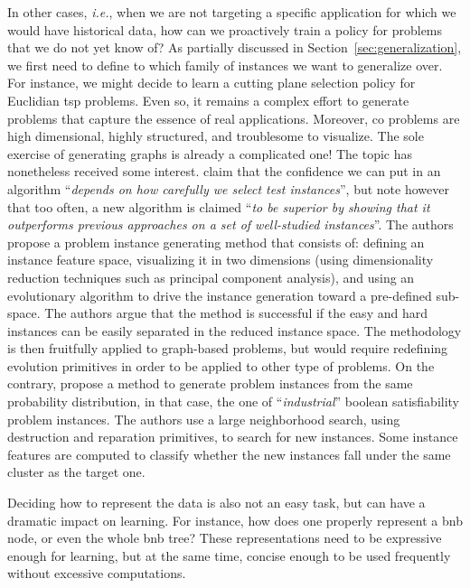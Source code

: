 \documentclass[11pt]{article}
\begin{document}
		In other cases, \textit{i.e.}, when we are not targeting a specific application for which we would
		have historical data, how can we proactively train a policy for problems that we do not yet know
		of?
		As partially discussed in Section~\ref{sec:generalization}, we first need to define to which family
		of instances we want to generalize over.
		For instance, we might decide to learn a cutting plane selection policy for Euclidian \gls{tsp}
		problems.
		Even so, it remains a complex effort to generate problems that capture the essence of real
		applications.
		Moreover, \gls{co} problems are high dimensional, highly structured, and troublesome to visualize.
		The sole exercise of generating graphs is already a complicated one!
		The topic has nonetheless received some interest.
		\cite{SmithGenerating2015} claim that the confidence we can put in an algorithm
		``\textit{depends on how carefully we select test instances}'', but note however that too often, a
		new algorithm is claimed ``\textit{to be superior by showing that it outperforms previous approaches
		on a set of well-studied instances}''.
		The authors propose a problem instance generating method that consists of: defining an instance
		feature space, visualizing it in two dimensions (using dimensionality reduction techniques such as
		principal component analysis), and using an evolutionary algorithm to drive the instance generation
		toward a pre-defined sub-space.
		The authors argue that the method is successful if the easy and hard instances can be easily
		separated in the reduced instance space.
		The methodology is then fruitfully applied to graph-based problems, but would require redefining
		evolution primitives in order to be applied to other type of problems.
		On the contrary, \cite{MalitskyStructurePreserving2016} propose a method to generate problem
		instances from the same probability distribution, in that case, the one of ``\textit{industrial}''
		boolean satisfiability problem instances.
		The authors use a large neighborhood search, using destruction and reparation primitives, to search
		for new instances.
		Some instance features are computed to classify whether the new instances fall under the same cluster as
		the target one.

		Deciding how to represent the data is also not an easy task, but can have a dramatic impact on
		learning.
		For instance, how does one properly represent a \gls{bnb} node, or even the whole \gls{bnb} tree?
		These representations need to be expressive enough for learning, but at the same time, concise
		enough to be used frequently without excessive computations.
\end{document}
